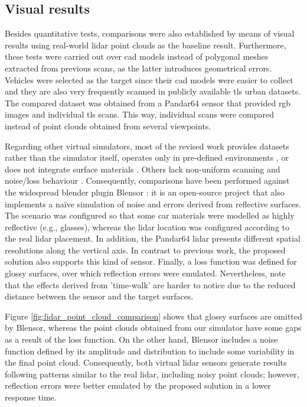 \subsection{Visual results}

Besides quantitative tests, comparisons were also established by means of visual results using real-world \acrshort{lidar} point clouds as the baseline result. Furthermore, these tests were carried out over \acrshort{cad} models instead of polygonal meshes extracted from previous scans, as the latter introduces geometrical errors. Vehicles were selected as the target since their \acrshort{cad} models were easier to collect and they are also very frequently scanned in publicly available \acrshort{tls} urban datasets. The compared dataset was obtained from a Pandar64 sensor \cite{hesai_pandaset_2021} that provided \acrshort{rgb} images and individual \acrshort{tls} scans. This way, individual scans were compared instead of point clouds obtained from several viewpoints. 

Regarding other virtual simulators, most of the revised work provides datasets rather than the simulator itself, operates only in pre-defined environments \cite{lg_electronics_rd_lab_lgsvl_2021}, or does not integrate surface materials \cite{yue_lidar_2018, xiao_synlidar_2021, manivasagam_lidarsim_2020, fang_augmented_2020, su_simulation_2019}. Others lack non-uniform scanning \cite{dosovitskiy_carla_2017} and noise/loss behaviour \cite{shah_airsim_2017}. Consequently, comparisons have been performed against the widespread blender plugin Blensor \cite{gschwandtner_blensor_2011}: it is an open-source project that also implements a naïve simulation of noise and errors derived from reflective surfaces. The scenario was configured so that some car materials were modelled as highly reflective (e.g., glasses), whereas the \acrshort{lidar} location was configured according to the real \acrshort{lidar} placement. In addition, the Pandar64 \acrshort{lidar} presents different spatial resolutions along the vertical axis. In contrast to previous work, the proposed solution also supports this kind of sensor. Finally, a loss function was defined for glossy surfaces, over which reflection errors were emulated. Nevertheless, note that the effects derived from 'time-walk' are harder to notice due to the reduced distance between the sensor and the target surfaces. 

Figure \ref{fig:lidar_point_cloud_comparison} shows that glossy surfaces are omitted by Blensor, whereas the point clouds obtained from our simulator have some gaps as a result of the loss function. On the other hand, Blensor includes a noise function defined by its amplitude and distribution to include some variability in the final point cloud. Consequently, both virtual \acrshort{lidar} sensors generate results following patterns similar to the real \acrshort{lidar}, including noisy point clouds; however, reflection errors were better emulated by the proposed solution in a lower response time.

